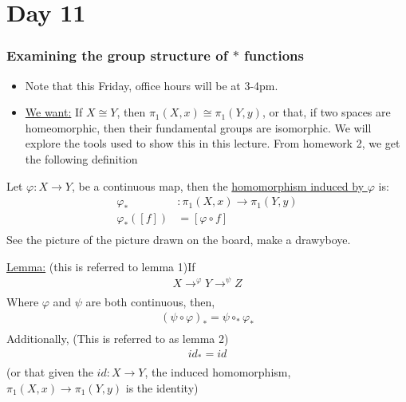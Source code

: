 \section{Day 11}
    \subsubsection{Examining the group structure of $*$ functions}
    \begin{itemize}
        \item Note that this Friday, office hours will be at 3-4pm.
        \item \underline{We want:} If $X\cong Y$, then $\pi_1(X,x)\cong \pi_1(Y,y)$,
            or that, if two spaces are homeomorphic, then their fundamental groups are isomorphic. We
            will explore the tools used to show this in this lecture. From homework 2, we get the following
            definition
    \end{itemize}
    \begin{definition}
        Let $\varphi: X\rightarrow Y$, be a continuous
        map, then the \underline{homomorphism induced by $\varphi$} is:
        \begin{align*}
            \varphi_{*}&: \pi_1(X,x)\rightarrow \pi_1(Y,y)\\
            \varphi_{*}([f])&=[\varphi\circ f]\\
        \end{align*}
        See the picture of the picture drawn on the board, make a drawyboye.
    \item \underline{Lemma:} (this is referred to lemma 1)If
        \begin{align*}
            X\rightarrow^{\varphi}Y\rightarrow^{\psi}Z\\
        \end{align*}
        Where $\varphi$ and $\psi$ are both continuous, then,
        \begin{align*}
            (\psi \circ \varphi)_{*}=\psi \circ_{*} \varphi_{*}\\
        \end{align*}
        Additionally, (This is referred to as lemma 2)
        \begin{align*}
            {id}_{*}=id\\
        \end{align*}
        (or that given the $id: X\rightarrow Y$, the induced homomorphism,
        $\pi_{1}(X,x)\rightarrow \pi_{1}(Y,y)$ is the identity)
    \end{definition}
